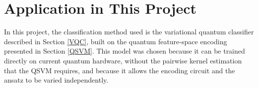 \section{Application in This Project}

In this project, the classification method used is the variational quantum classifier described in Section \ref{VQC}, built on the quantum feature-space encoding presented in Section \ref{QSVM}. This model was chosen because it can be trained directly on current quantum hardware, without the pairwise kernel estimation that the QSVM requires, and because it allows the encoding circuit and the ansatz to be varied independently.